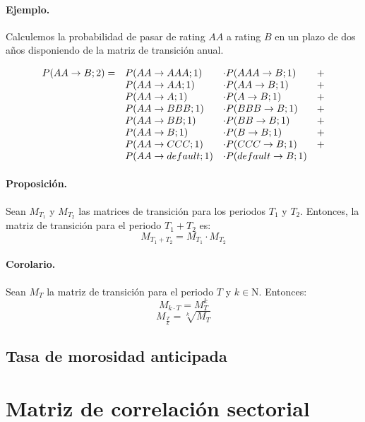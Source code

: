 \paragraph{Ejemplo.} Calculemos la probabilidad de pasar de rating $AA$ a
rating $B$ en un plazo de dos a\~nos disponiendo de la matriz de transici\'on anual.

\begin{displaymath}
\begin{array}{llll}
P(AA \to B;2) = & P(AA \to AAA;1)    & \cdot P(AAA \to B;1)      & + \cr
                & P(AA \to AA;1)      & \cdot P(AA \to B;1)      & + \cr
                & P(AA \to A;1)       & \cdot P(A \to B;1)       & + \cr
                & P(AA \to BBB;1)     & \cdot P(BBB \to B;1)     & + \cr
                & P(AA \to BB;1)      & \cdot P(BB \to B;1)      & + \cr
                & P(AA \to B;1)       & \cdot P(B \to B;1)       & + \cr
                & P(AA \to CCC;1)     & \cdot P(CCC \to B;1)     & + \cr
                & P(AA \to default;1) & \cdot P(default \to B;1) &
\end{array}
\end{displaymath}

\paragraph{Proposici\'on.} Sean $M_{T_1}$ y $M_{T_2}$ las matrices de transici\'on
para los periodos $T_1$ y $T_2$. Entonces, la matriz de transici\'on para el
periodo $T_1+T_2$ es:
\begin{displaymath}
M_{T_1+T_2} = M_{T_1} \cdot M_{T_2}
\end{displaymath}

\paragraph{Corolario.} Sean $M_{T}$ la matriz de transici\'on para el periodo 
$T$ y $k \in \mathrm{N}$. Entonces:
\begin{displaymath}
M_{k \cdot T} = M_{T}^k
\end{displaymath}
\begin{displaymath}
M_{\frac{T}{k}} = \sqrt[k]{M_{T}}
\end{displaymath}


\subsection{Tasa de morosidad anticipada}



\section{Matriz de correlaci\'on sectorial}


